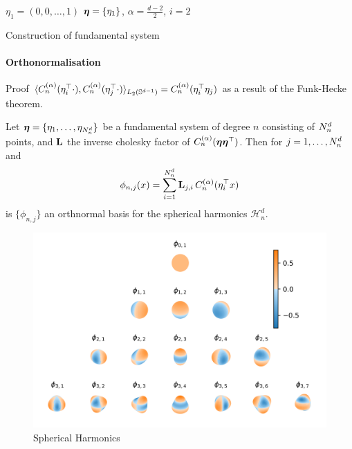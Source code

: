\begin{algorithm}[H]
    \SetAlgoLined
    \DontPrintSemicolon
    $\eta_1 = (0,0,\ldots,1)$ 
    $\boldsymbol{\eta} = \{\eta_1\}$,
    $\alpha = \frac{d-2}{2}$,
    $i = 2$\;
     \caption{Construction of fundamental system\label{alg:fundamental-system}}
\end{algorithm}

\paragraph{Orthonormalisation}

Proof $\langle C_n^{(\alpha)}(\eta_i^{\top} \cdot), C_n^{(\alpha)}(\eta_j^{\top} \cdot) \rangle_{L_2(\mathbb{S}^{d-1})} = C_n^{(\alpha)}(\eta_i^{\top}\eta_j)$ as a result of the Funk-Hecke theorem.

\begin{theorem}
   Let $\boldsymbol{\eta} = \{\eta_1, \ldots, \eta_{N^d_n}\}$ be a fundamental system of degree $n$ consisting of $N^d_n$ points, and $\mathbf{{L}}$ the inverse cholesky factor of $C_n^{(\alpha)}(\boldsymbol{\eta}\boldsymbol{\eta}^{\top})$. Then for $j=1,\ldots,N^d_n$ and
    \begin{equation}
    \phi_{n,j}(x) = \sum_{i=1}^{N^d_n} \mathbf{{L}}_{j,i}\,C_n^{(\alpha)}(\eta_i^{\top} x)
    \end{equation}
    is $\{\phi_{n,j}\}$ an orthnormal basis for the spherical harmonics $\mathcal{H}_n^d$.
\end{theorem}

\begin{figure}
    \centering
    \includegraphics[width=.6\linewidth]{Appendix1/harmonics}
    \caption{Spherical Harmonics}
    \label{fig:appendix:harmonics}
\end{figure}